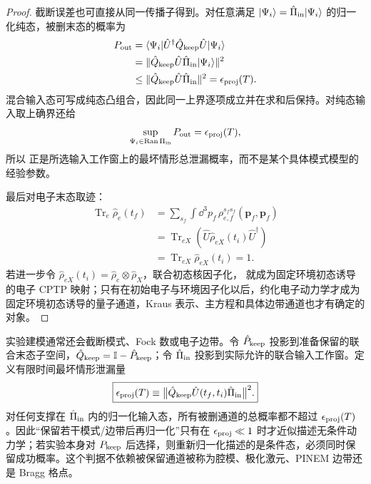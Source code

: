 \begin{proof}
截断误差也可直接从同一传播子得到。对任意满足
$|\Psi_i\rangle=\hat\Pi_{\rm in}|\Psi_i\rangle$ 的归一化纯态，被删末态的概率为
\begin{align*}
P_{\rm out}
&=\langle\Psi_i|\hat U^\dagger\hat Q_{\rm keep}\hat U|\Psi_i\rangle\\
&=\|\hat Q_{\rm keep}\hat U\hat\Pi_{\rm in}|\Psi_i\rangle\|^2\\
&\le
\|\hat Q_{\rm keep}\hat U\hat\Pi_{\rm in}\|^2
=\epsilon_{\rm proj}(T).
\end{align*}
混合输入态可写成纯态凸组合，因此同一上界逐项成立并在求和后保持。对纯态输入取上确界还给
\[
\sup_{\Psi_i\in\operatorname{Ran}\Pi_{\rm in}}P_{\rm out}
=\epsilon_{\rm proj}(T),
\]
所以 正是所选输入工作窗上的最坏情形总泄漏概率，而不是某个具体模式模型的经验参数。

最后对电子末态取迹：
\begin{align*}
\operatorname{Tr}_e\hat\rho_e(t_f)
&=\sum_{s_f}\int\dd^3p_f\,
\rho_{e,f}^{s_f s_f}(\mathbf p_f,\mathbf p_f)\\
&=\operatorname{Tr}_{eX}
\left(\hat U\hat\rho_{eX}(t_i)\hat U^\dagger\right)\\
&=\operatorname{Tr}_{eX}\hat\rho_{eX}(t_i)=1.
\end{align*}
若进一步令
$\hat\rho_{eX}(t_i)=\hat\rho_e\otimes\hat\rho_X$，联合初态核因子化， 就成为固定环境初态诱导的电子 CPTP 映射；只有在初始电子与环境因子化以后，约化电子动力学才成为固定环境初态诱导的量子通道，Kraus 表示、主方程和具体边带通道也才有确定的对象。
\end{proof}


实验建模通常还会截断模式、Fock 数或电子边带。令 $\hat P_{\rm keep}$ 投影到准备保留的联合末态子空间，$\hat Q_{\rm keep}=\mathbb I-\hat P_{\rm keep}$；令 $\hat\Pi_{\rm in}$ 投影到实际允许的联合输入工作窗。定义有限时间最坏情形泄漏量
\begin{equation}
\boxed{
\epsilon_{\rm proj}(T)
\equiv
\bigl\|\hat Q_{\rm keep}\hat U(t_f,t_i)\hat\Pi_{\rm in}\bigr\|^2.}
\label{eq:exact_projection_leakage_bound}
\end{equation}
对任何支撑在 $\hat\Pi_{\rm in}$ 内的归一化输入态，所有被删通道的总概率都不超过 $\epsilon_{\rm proj}(T)$。因此“保留若干模式/边带后再归一化”只有在 $\epsilon_{\rm proj}\ll1$ 时才近似描述无条件动力学；若实验本身对 $P_{\rm keep}$ 后选择，则重新归一化描述的是条件态，必须同时保留成功概率。这个判据不依赖被保留通道被称为腔模、极化激元、PINEM 边带还是 Bragg 格点。

